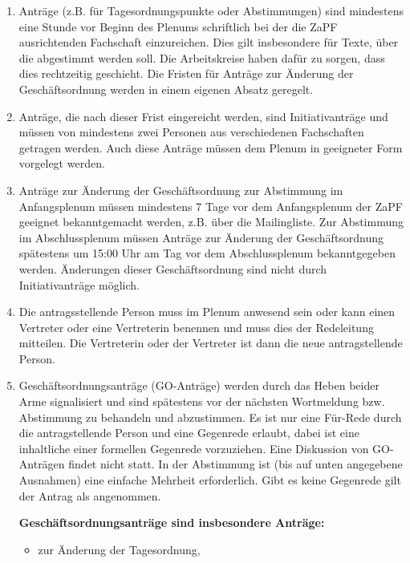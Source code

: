 \documentclass[draft,12pt,oneside]{scrreprt}
\begin{document}
\begin{enumerate}
  \item Anträge (z.B. für Tagesordnungspunkte oder Abstimmungen) sind mindestens
        eine Stunde vor Beginn des Plenums schriftlich bei der die ZaPF
        ausrichtenden Fachschaft einzureichen.
        Dies gilt insbesondere für Texte, über die abgestimmt werden soll.
        Die Arbeitskreise haben dafür zu sorgen, dass dies rechtzeitig geschieht.
        Die Fristen für Anträge zur Änderung der Geschäftsordnung werden in einem
        eigenen Absatz geregelt.

  \item Anträge, die nach dieser Frist eingereicht werden, sind Initiativanträge
        und müssen von mindestens zwei Personen aus verschiedenen Fachschaften
        getragen werden. Auch diese Anträge müssen dem Plenum in geeigneter Form
        vorgelegt werden.

  \item Anträge zur Änderung der Geschäftsordnung zur Abstimmung im Anfangsplenum
        müssen mindestens 7 Tage vor dem Anfangsplenum der ZaPF geeignet
        bekanntgemacht werden, z.B. über die Mailingliste.
        Zur Abstimmung im Abschlussplenum müssen Anträge zur Änderung der
        Geschäftsordnung spätestens um 15:00 Uhr am Tag vor dem Abschlussplenum
        bekanntgegeben werden.
        Änderungen dieser Geschäftsordnung sind nicht durch Initiativanträge möglich.

  \item Die antragsstellende Person muss im Plenum anwesend sein
        oder kann einen Vertreter oder eine Vertreterin benennen und muss dies
        der Redeleitung mitteilen.
        Die Vertreterin oder der Vertreter ist dann die neue antragstellende Person.

  \item Geschäftsordnungsanträge (GO-Anträge) werden durch das Heben beider Arme
        signalisiert und sind spätestens vor der nächsten Wortmeldung bzw.
        Abstimmung zu behandeln und abzustimmen.
        Es ist nur eine Für-Rede durch die antragstellende Person und eine Gegenrede
        erlaubt, dabei ist eine inhaltliche einer formellen Gegenrede vorzuziehen.
        Eine Diskussion von GO-Anträgen findet nicht statt.
        In der Abstimmung ist (bis auf unten angegebene Ausnahmen) eine einfache
        Mehrheit erforderlich.
        Gibt es keine Gegenrede gilt der Antrag als angenommen.

    \textbf{Geschäftsordnungsanträge sind insbesondere Anträge:}
    \begin{itemize}
      \item zur Änderung der Tagesordnung,


\end{itemize}
\end{enumerate}
\end{document}
